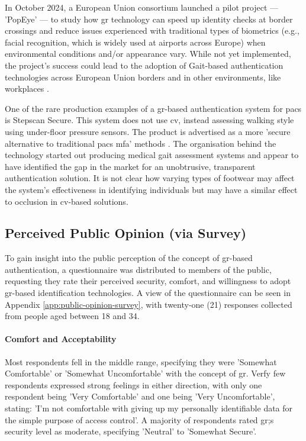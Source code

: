 In October 2024, a European Union consortium launched a pilot project --- 'PopEye' --- to study how \ac{gr} technology can speed up identity checks at border crossings and reduce issues experienced with traditional types of biometrics (e.g., facial recognition, which is widely used at airports across Europe) when environmental conditions and/or appearance vary.
While not yet implemented, the project's success could lead to the adoption of Gait-based authentication technologies across European Union borders and in other environments, like workplaces \parencite{chrisburtPopEyeStrengthenEU2024}.

One of the rare production examples of a \ac{gr}-based authentication system for \ac{pacs} is Stepscan Secure.
This system does not use \ac{cv}, instead assessing walking style using under-floor pressure sensors. The product is advertised as a more 'secure alternative to traditional \ac{pacs} \ac{mfa}' methods \parencite{stepscanGaitAuthenticationSecurity2020}.
The organisation behind the technology started out producing medical gait assessment systems and appear to have identified the gap in the market for an unobtrusive, transparent authentication solution.
It is not clear how varying types of footwear may affect the system's effectiveness in identifying individuals but may have a similar effect to occlusion in \ac{cv}-based solutions.


\subsection{Perceived Public Opinion (via Survey)}
\label{subsec:perceived-public-opinion-via-survey}

To gain insight into the public perception of the concept of \ac{gr}-based authentication, a questionnaire was distributed to members of the public, requesting they rate their perceived security, comfort, and willingness to adopt \ac{gr}-based identification technologies. A view of the questionnaire can be seen in Appendix \ref{app:public-opinion-survey}, with twenty-one (21) responses collected from people aged between 18 and 34.

\paragraph{Comfort and Acceptability} Most respondents fell in the middle range, specifying they were 'Somewhat Comfortable' or 'Somewhat Uncomfortable' with the concept of \ac{gr}. Verfy few respondents expressed strong feelings in either direction, with only one respondent being 'Very Comfortable' and one being 'Very Uncomfortable', stating: 'I'm not comfortable with giving up my personally identifiable data for the simple purpose of access control'. A majority of respondents rated \ac{gr};s security level as moderate, specifying 'Neutral' to 'Somewhat Secure'.


